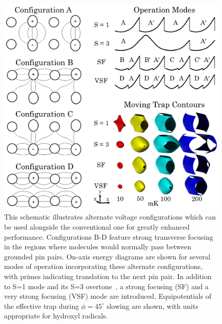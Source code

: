 \documentclass[%
 reprint,
 amsmath,amssymb,
 aps,
prl,
]{revtex4-1}
\begin{document}
\begin{figure}[ht!]
\includegraphics[width=\linewidth]{chargecartoon.png}%
\caption{
This schematic illustrates alternate voltage configurations which can be used alongside the conventional one for greatly enhanced performance. Configurations B-D feature strong transverse focusing in the regions where molecules would normally pass between grounded pin pairs. On-axis energy diagrams are shown for several modes of operation incorporating these alternate configurations, with primes indicating translation to the next pin pair. In addition to S=1 mode and its S=3 overtone~\cite{VanDeMeerakker2005a}, a strong focusing (SF) and a very strong focusing (VSF) mode are introduced. Equipotentials of the effective trap during $\phi=45^\circ$ slowing are shown, with units appropriate for hydroxyl radicals.\vspace{-4mm}
}
\label{fig:chargecartoon}
\end{figure}
\end{document}

